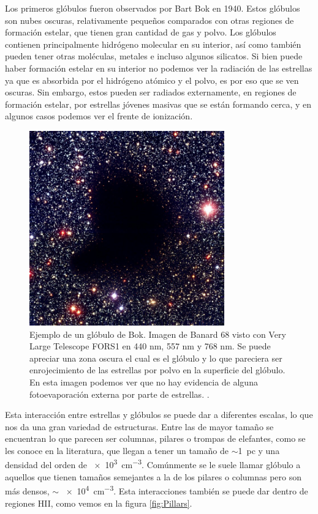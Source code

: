 \documentclass{book}
\begin{document}
Los primeros glóbulos fueron observados por Bart Bok en 1940. Estos glóbulos son nubes oscuras, relativamente pequeños comparados con otras regiones de formación estelar, que tienen gran cantidad de gas y polvo. Los glóbulos contienen principalmente hidrógeno molecular en su interior, así como también pueden tener otras moléculas, metales e incluso algunos silicatos. Si bien puede haber formación estelar en su interior no podemos ver la radiación de las estrellas ya que es absorbida por el hidrógeno atómico y el polvo, es por eso que se ven oscuras. Sin embargo, estos pueden ser radiados externamente, en regiones de formación estelar, por estrellas jóvenes masivas que se están formando cerca, y en algunos casos podemos ver el frente de ionización.

\begin{figure}[h!]
    \centering
    \includegraphics[width=0.75\textwidth]{images Chapter 1/C1_Bok_globule.jpg}
    \caption{Ejemplo de un glóbulo de Bok. Imagen de Banard 68 visto con Very Large Telescope FORS1 en 440 nm, 557 nm y 768 nm. Se puede apreciar una zona oscura el cual es el glóbulo y lo que pareciera ser enrojecimiento de las estrellas por polvo en la superficie del glóbulo. En esta imagen podemos ver que no hay evidencia de alguna fotoevaporación externa por parte de estrellas. \citep{Alves:2001}.}
    \label{fig:Banard}
\end{figure}

Esta interacción entre estrellas y glóbulos se puede dar a diferentes escalas, lo que nos da una gran variedad de estructuras. Entre las de mayor tamaño se encuentran lo que parecen ser columnas, pilares o trompas de elefantes, como se les conoce en la literatura, que llegan a tener un tamaño de $\sim$\SI{1}{pc} y una densidad del orden de \SI{e3}{cm^{-3}}. Comúnmente se le suele llamar glóbulo a aquellos que tienen tamaños semejantes a la de los pilares o columnas pero son más densos, $\sim$ \SI{e4}{cm^{-3}}. Esta interacciones también se puede dar dentro de regiones HII, como vemos en la figura \ref{fig:Pillars}.
\end{document}
